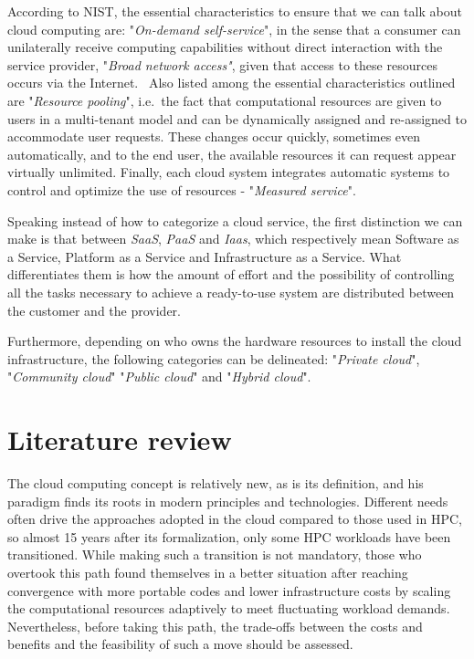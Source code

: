 According to NIST, the essential characteristics to ensure that we can
talk about cloud computing are: "\textit{On-demand self-service}",
in the sense that a consumer can unilaterally receive computing capabilities
without direct interaction with the service provider, "\textit{Broad network
  access"}, given that access to these resources occurs via the Internet.
 Also listed among the essential characteristics outlined are "\textit{Resource
  pooling}",
i.e. the fact that computational resources are given to users in a multi-tenant
model and can be dynamically assigned and re-assigned to accommodate user
requests.
These changes occur quickly, sometimes even automatically, and to the end user,
the available resources it can request appear virtually unlimited.
Finally, each cloud system integrates automatic systems to control and optimize
the use of resources - "\textit{Measured service}".

Speaking instead of how to categorize a cloud service, the first distinction we
can make is that between \textit{SaaS}, \textit{PaaS} and \textit{Iaas}, which
respectively mean Software as a Service, Platform as a Service and
Infrastructure as a Service. What differentiates them is how the amount of
effort and the possibility of controlling all the tasks necessary to achieve a
ready-to-use system are distributed between the customer and the provider.

\noindent Furthermore, depending on who owns the hardware resources to install the cloud
infrastructure, the following categories can be delineated: "\textit{Private
  cloud}", "\textit{Community cloud}" "\textit{Public cloud}" and
"\textit{Hybrid cloud}".

\section{Literature review}\label{sec:intro-literature-review}

The cloud computing concept is relatively new, as is its definition, and his
paradigm finds its roots in modern principles and technologies. Different needs
often drive the approaches adopted in the cloud compared to those used in HPC,
so almost 15 years after its formalization, only some HPC workloads have been
transitioned. While making such a transition is not mandatory, those who
overtook this path found themselves in a better situation after reaching
convergence with more portable codes and lower infrastructure costs by scaling
the computational resources adaptively to meet fluctuating workload demands.
Nevertheless, before taking this path, the trade-offs between the costs and
benefits and the feasibility of such a move should be assessed.

